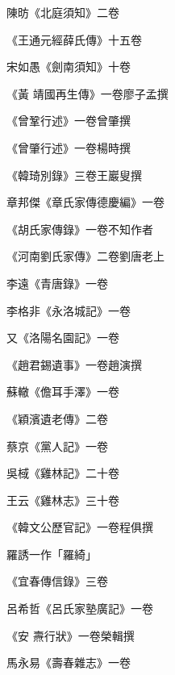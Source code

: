 \begin{pinyinscope}
 陳昉《北庭須知》二卷



 《王通元經薛氏傳》十五卷



 宋如愚《劍南須知》十卷



 《黃
 靖國再生傳》一卷廖子孟撰



 《曾鞏行述》一卷曾肇撰



 《曾肇行述》一卷楊時撰



 《韓琦別錄》三卷王巖叟撰



 章邦傑《章氏家傳德慶編》一卷



 《胡氏家傳錄》一卷不知作者



 《河南劉氏家傳》二卷劉唐老上



 李遠《青唐錄》一卷



 李格非《永洛城記》一卷



 又《洛陽名園記》一卷



 《趙君錫遺事》一卷趙演撰



 蘇轍《儋耳手澤》一卷



 《穎濱遺老傳》二卷



 蔡京《黨人記》一卷



 吳棫《雞林記》二十卷



 王云《雞林志》三十卷



 《韓文公歷官記》一卷程俱撰



 羅誘一作「羅綺」



 《宜春傳信錄》三卷



 呂希哲《呂氏家塾廣記》一卷



 《安
 燾行狀》一卷榮輯撰



 馬永易《壽春雜志》一卷




\end{pinyinscope}

